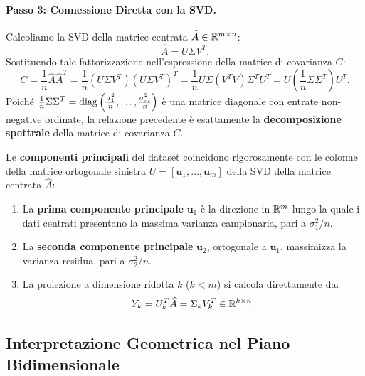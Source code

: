 \paragraph{Passo 3: Connessione Diretta con la SVD.}
Calcoliamo la SVD della matrice centrata $\widehat{A} \in \mathbb{R}^{m \times n}$:
\begin{equation}
    \widehat{A} = U \Sigma V^T.
\end{equation}
Sostituendo tale fattorizzazione nell'espressione della matrice di covarianza $C$:
\begin{equation}
    C = \frac{1}{n} \widehat{A} \widehat{A}^T = \frac{1}{n} (U \Sigma V^T) (U \Sigma V^T)^T = \frac{1}{n} U \Sigma (V^T V) \Sigma^T U^T = U \left( \frac{1}{n} \Sigma \Sigma^T \right) U^T.
\end{equation}
Poich\'e $\frac{1}{n} \Sigma \Sigma^T = \operatorname{diag}\left( \frac{\sigma_1^2}{n}, \dots, \frac{\sigma_m^2}{n} \right)$ \`e una matrice diagonale con entrate non-negative ordinate, la relazione precedente \`e esattamente la \textbf{decomposizione spettrale} della matrice di covarianza $C$.

\begin{theorem}
Le \textbf{componenti principali} del dataset coincidono rigorosamente con le colonne della matrice ortogonale sinistra $U = [\mathbf{u}_1, \dots, \mathbf{u}_m]$ della SVD della matrice centrata $\widehat{A}$:
\begin{enumerate}
    \item La \textbf{prima componente principale} $\mathbf{u}_1$ \`e la direzione in $\mathbb{R}^m$ lungo la quale i dati centrati presentano la massima varianza campionaria, pari a $\sigma_1^2 / n$.
    \item La \textbf{seconda componente principale} $\mathbf{u}_2$, ortogonale a $\mathbf{u}_1$, massimizza la varianza residua, pari a $\sigma_2^2 / n$.
    \item La proiezione a dimensione ridotta $k$ ($k < m$) si calcola direttamente da:
    \begin{equation}
        Y_k = U_k^T \widehat{A} = \Sigma_k V_k^T \in \mathbb{R}^{k \times n}.
    \end{equation}
\end{enumerate}
\end{theorem}

\subsection{Interpretazione Geometrica nel Piano Bidimensionale}

